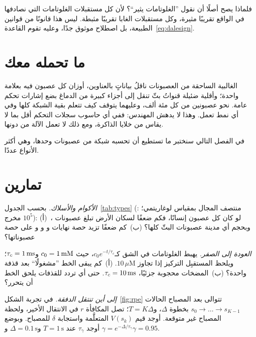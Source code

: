 فلماذا يصح أصلًا أن نقول ”الغلوتامات يثير“؟ لأن كل مستقبلات الغلوتامات التي نصادفها في الواقع تقريبًا مثيرة، وكل مستقبلات الغابا تقريبًا مثبطة. ليس هذا قانونًا من قوانين الطبيعة، بل اصطلاح موثوق جدًا، وعليه تقوم القاعدة~\eqref{eq:dalesign}.

\section{ما تحمله معك}

الغالبية الساحقة من العصبونات ناقلُ بياناتٍ بالعناوين، أوزان كل عصبون فيه بعلامة واحدة؛ وأقلية ضئيلة قنواتُ بثّ تنقل إلى أجزاء كبيرة من الدماغ بضع إشارات تحكم عامة. نحو عصبونين من كل مئة ألف، وعليهما يتوقف كيف تتعلم بقية الشبكة كلها وفي أي نمط تعمل. وهذا لا يدهش المهندس: ففي أي حاسوب سجلات التحكم أقل بما لا يقاس من خلايا الذاكرة، ومع ذلك لا تعمل الآلة من دونها.

في الفصل التالي سنختبر ما تستطيع أن تحسبه شبكة من عصبونات  وحدها، وهي أكثر الأنواع عددًا.

\section{تمارين}

\begin{exercise}[\lvlA]
\label{ex:01:1}
\emph{الأكوام والأسلاك.} بحسب الجدول~\ref{tab:types} (منتصف المجال بمقياس لوغاريتمي؛ : $10^5$ مخرج): (أ)~لو كان كل عصبون إنسانًا، فكم ضعفًا لسكان الأرض تبلغ عصبونات ، وبحجم أي مدينة عصبونات البثّ كلها؟ (ب)~كم ضعفًا تزيد حصة نهايات  و و و على حصة عصبوناتها؟
\end{exercise}

\begin{exercise}[\lvlA]
\label{ex:01:2}
\emph{العودة إلى الصفر.} يهبط الغلوتامات في الشق كـ$c_0e^{-t/\tau_c}$، حيث $c_0=1\mM$ و$\tau_c=1\ms$؛ ويلحظ المستقبِل التركيز إذا تجاوز $10\,\mu\text{M}$. (أ)~كم يبقى الخط ”مشغولًا“ بعد قذفة واحدة؟ (ب)~المضخات محجوبة جزئيًا، $\tau_c=10\ms$. حتى أي تردد للقذفات يلحق الخط أن يتحرر؟
\end{exercise}

\begin{exercise}[\lvlB]
\label{ex:01:3}
\emph{إلى أين تنتقل الدفقة.} في تجربة الشكل~\ref{fig:rpe} تتوالى بعد المصباح الحالات $s_0\to\dots\to s_{K-1}$ بخطوة $\Delta$، و$T=K\Delta$؛ تصل المكافأة $r$ في الانتقال الأخير، ولحظة المصباح غير متوقعة. أوجد قيم $V(s_k)$ المتعلَّمة واستجابة $\delta$ للمصباح. وبوضع $\gamma=e^{-\Delta/\tau_\gamma}$ أوجد $\tau_\gamma$ عند $T=1\,\mathrm{s}$ و$\Delta=0.1\,\mathrm{s}$ و$\gamma=0.95$.
\end{exercise}

